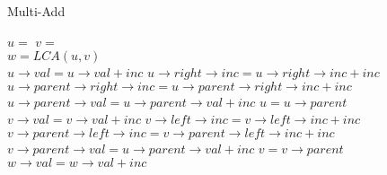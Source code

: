 \documentclass{article}
\begin{document}
    \begin{algorithm}[h!]
        \begin{algorithmic}[0]
            \caption{Multi-Add}
                \State $u =$  
                \State $v =$ 
                \\
                \State $w = LCA(u, v)$
                \\
                    \State $u \rightarrow val = u \rightarrow val + inc$
                        \State $u \rightarrow right \rightarrow inc = u \rightarrow right \rightarrow inc + inc$
                    \EndIf
                                \State $u \rightarrow parent \rightarrow right \rightarrow inc = u \rightarrow parent \rightarrow right \rightarrow inc + inc$
                            \EndIf
                            \State $u \rightarrow parent \rightarrow val = u \rightarrow parent \rightarrow val + inc$
                        \EndIf
                        \State {}
                        \State $u = u \rightarrow parent$
                    \EndWhile
                \EndIf
                \\
                    \State $v \rightarrow val = v \rightarrow val + inc$
                        \State $v \rightarrow left \rightarrow inc = v \rightarrow left \rightarrow inc + inc$
                    \EndIf
                                \State $v \rightarrow parent \rightarrow left \rightarrow inc = v \rightarrow parent \rightarrow left \rightarrow inc + inc$
                            \EndIf
                            \State $v \rightarrow parent \rightarrow val = u \rightarrow parent \rightarrow val + inc$
                        \EndIf
                        \State {}
                        \State $v = v \rightarrow parent$
                    \EndWhile
                \EndIf
                \\
                \State $w \rightarrow val = w \rightarrow val + inc$
                \State {}
            \EndProcedure
        \end{algorithmic}
    \end{algorithm}
    
\end{document}
